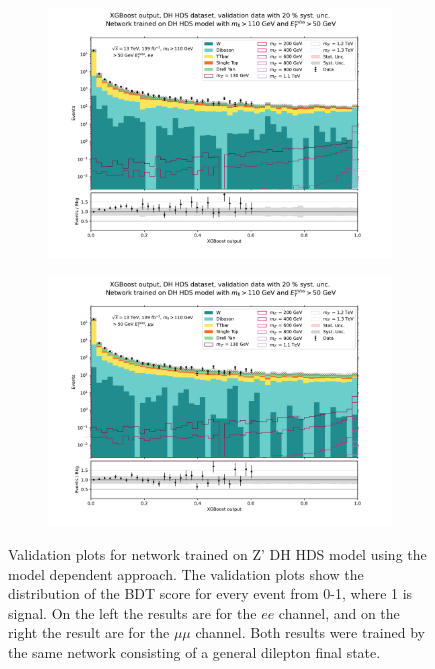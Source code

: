 \documentclass[12pt, a4paper]{book}
\begin{document}
\begin{figure}[!ht]
	\centering
	\begin{subfigure}[b]{0.49\textwidth}
      \centering
      \includegraphics[width=1\textwidth]{XGBoost/DH_HDS/VAL_ee.pdf}
      \end{subfigure}
   \hfill
   \begin{subfigure}[b]{0.49\textwidth}
      \centering
      \includegraphics[width=1\textwidth]{XGBoost/DH_HDS/VAL_uu.pdf}
      \end{subfigure}
   \caption[Validation plots for network trained on Z' DH HDS model using the model dependent approach. ]{Validation plots for network trained on Z' DH HDS model using the model dependent approach. The validation plots show the distribution of the BDT score for every event from 0-1, where 1 is signal. On the left the results are for the $ee$ channel, and on the right the result are for the $\mu\mu$ channel. Both results were 
   trained by the same network consisting of a general dilepton final state.}\label{fig:DH_HDS_vals}
\end{figure}
\end{document}
